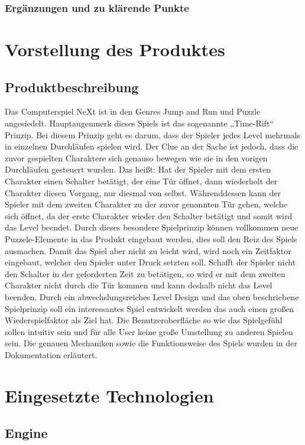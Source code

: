 \subsection{Ergänzungen und zu klärende Punkte}
\chapter{Vorstellung des Produktes}
\section{Produktbeschreibung}
Das Computerspiel NeXt ist in den Genres Jump and Run und Puzzle angesiedelt. Hauptaugenmerk dieses Spiels ist das sogenannte „Time-Rift“ Prinzip. Bei diesem Prinzip geht es darum, dass der Spieler jedes Level mehrmals in einzelnen Durchläufen spielen wird. Der Clue an der Sache ist jedoch, dass die zuvor gespielten Charaktere sich genauso bewegen wie sie in den vorigen Durchläufen gesteuert wurden. Das heißt: Hat der Spieler mit dem ersten Charakter einen Schalter betätigt, der eine Tür öffnet, dann wiederholt der Charakter diesen Vorgang, nur diesmal von selbst. Währenddessen kann der Spieler mit dem zweiten Charakter zu der zuvor genannten Tür gehen, welche sich öffnet, da der erste Charakter wieder den Schalter betätigt und somit wird das Level beendet. Durch dieses besondere Spielprinzip können vollkommen neue Puzzele-Elemente in das Produkt eingebaut werden, dies soll den Reiz des Spiels ausmachen.  Damit das Spiel aber nicht zu leicht wird, wird noch ein Zeitfaktor eingebaut, welcher den Spieler unter Druck setzten soll. Schafft der Spieler nicht den Schalter in der geforderten Zeit zu betätigen, so wird er mit dem zweiten Charakter nicht durch die Tür kommen und kann deshalb nicht das Level beenden. Durch ein abwechslungsreiches Level Design und das oben beschriebene Spielprinzip soll ein interessantes Spiel entwickelt werden das auch einen großen Wiederspielfaktor als Ziel hat. Die Benutzeroberfläche so wie das Spielgefühl sollen intuitiv sein und für alle User keine große Umstellung zu anderen Spielen sein. Die genauen Mechaniken sowie die Funktionsweise des Spiels wurden in der Dokumentation erläutert.  
\chapter{Eingesetzte Technologien}
\section{Engine}

